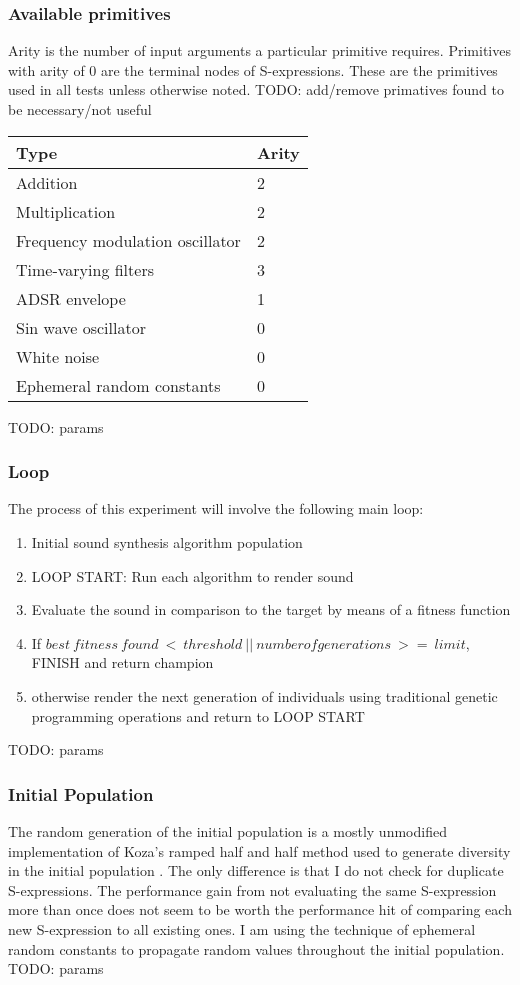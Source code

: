 \documentclass[12pt]{article}
\begin{document}
\subsubsection{Available primitives}
Arity is the number of input arguments a particular primitive requires. Primitives with arity of $0$ are the terminal nodes of S-expressions. These are the primitives used in all tests unless otherwise noted. TODO: add/remove primatives found to be necessary/not useful
\begin{center}
\begin{tabular}{ | l | l | } \hline
Type & Arity \\ \hline
Addition & 2 \\ \hline
Multiplication & 2 \\ \hline
Frequency modulation oscillator & 2 \\ \hline
Time-varying filters & 3 \\ \hline
ADSR envelope & 1 \\ \hline
Sin wave oscillator & 0 \\ \hline
White noise & 0 \\ \hline
Ephemeral random constants & 0 \\ \hline
\end{tabular}
\end{center}
TODO: params
\subsubsection{Loop}
The process of this experiment will involve the following main loop:
\begin{enumerate}
\item
Initial sound synthesis algorithm population
\item
LOOP START:
Run each algorithm to render sound
\item
Evaluate the sound in comparison to the target by means of a fitness function
\item
If $best\ fitness\ found\ <\ threshold\ ||\ number of generations\ >=\ limit$, FINISH and return champion
\item
otherwise render the next generation of individuals using traditional genetic programming operations and return to LOOP START
\end{enumerate}
TODO: params
\subsubsection{Initial Population}
The random generation of the initial population is a mostly unmodified implementation of Koza's ramped half and half method used to generate diversity in the initial population \citep{koza1992genetic}. The only difference is that I do not check for duplicate S-expressions. The performance gain from not evaluating the same S-expression more than once does not seem to be worth the performance hit of comparing each new S-expression to all existing ones. I am using the technique of ephemeral random constants to propagate random values throughout the initial population.
TODO: params
\end{document}
